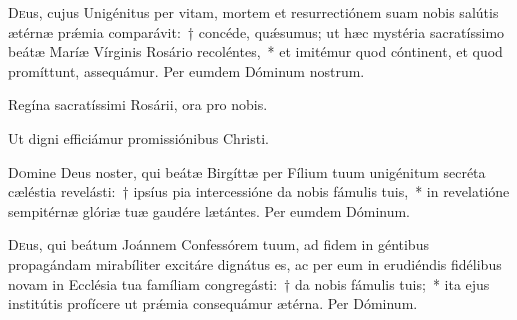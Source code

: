 \documentclass[vesperale_romanum.tex]{subfiles}
\begin{document}
\admagnificat
 
 \oratio
 
 \lettrine{D}{e}us, cujus Unigénitus per vitam, mortem et resurrectiónem suam nobis salútis ætérnæ prǽmia comparávit:~† concéde, quǽsumus; ut hæc mystéria sacratíssimo beátæ Maríæ Vírginis Rosário recoléntes,~* et imitémur quod cóntinent, et quod promíttunt, assequámur. Per eumdem Dóminum nostrum.
 
 


\omniapraeter

\hymnus


\vv Regína sacratíssimi Rosárii, ora pro nobis.

\rr Ut digni efficiámur promissiónibus Christi.

\admagnificat

\commemoration

\myrule


\duplex


\oratio

\lettrine{D}{o}mine Deus noster, qui beátæ Birgíttæ per Fílium tuum unigénitum secréta cæléstia revelásti:~† ipsíus pia intercessióne da nobis fámulis tuis,~* in revelatióne sempitérnæ glóriæ tuæ gaudére lætántes.
Per eumdem Dóminum.

\capitdeseq

\myrule


\duplex

\oratio

\lettrine{D}{e}us, qui beátum Joánnem Confessórem tuum, ad fidem in géntibus propagándam mirabíliter excitáre dignátus es, ac per eum in erudiéndis fidélibus novam in Ecclésia tua famíliam congregásti:~† da nobis fámulis tuis;~* ita ejus institútis profícere ut prǽmia consequámur ætérna.
Per Dóminum.
\end{document}
